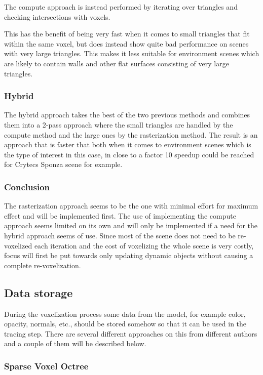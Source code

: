 \documentclass[a4paper, 12pt]{article}
\begin{document}
The compute approach is instead performed by iterating over triangles and checking intersections with voxels.

This has the benefit of being very fast when it comes to small triangles that fit within the same voxel, but does instead show quite bad performance on scenes with very large triangles. This makes it less suitable for environment scenes which are likely to contain walls and other flat surfaces consisting of very large triangles. 

\subsubsection{Hybrid}

The hybrid approach takes the best of the two previous methods and combines them into a 2-pass approach where the small triangles are handled by the compute method and the large ones by the rasterization method. The result is an approach that is faster that both when it comes to environment scenes which is the type of interest in this case, in \cite{phdthesis} close to a factor 10 speedup could be reached for Crytecs Sponza scene for example.

\subsubsection{Conclusion}

The rasterization approach seems to be the one with minimal effort for maximum effect and will be implemented first. The use of implementing the compute approach seems limited on its own and will only be implemented if a need for the hybrid approach seems of use. Since most of the scene does not need to be re-voxelized each iteration and the cost of voxelizing the whole scene is very costly, focus will first be put towards only updating dynamic objects without causing a complete re-voxelization.

\subsection{Data storage}

During the voxelization process some data from the model, for example color, opacity, normals, etc., should be stored somehow so that it can be used in the tracing step. There are several different approaches on this from different authors and a couple of them will be described below.

\subsubsection{Sparse Voxel Octree}
\end{document}
